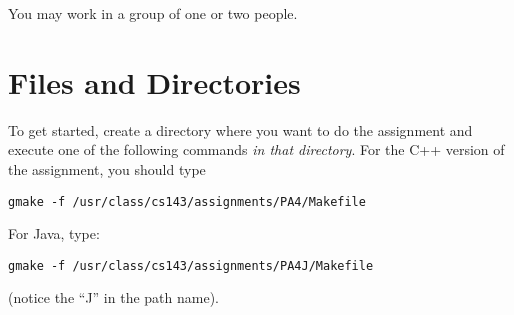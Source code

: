\documentclass[11pt]{article}
\begin{document}
You may work in a group of one or two people.


\section{Files and Directories}

%
%
%
%
%
%

To get started, create a directory where you want to do the assignment
and execute one of the following commands {\em in that directory}.  For
the C++ version of the assignment, you should type

\begin{verbatim}
gmake -f /usr/class/cs143/assignments/PA4/Makefile
\end{verbatim}

\noindent For Java, type:

\begin{verbatim}
gmake -f /usr/class/cs143/assignments/PA4J/Makefile
\end{verbatim}

\noindent
(notice the ``J'' in the path name).
\end{document}
